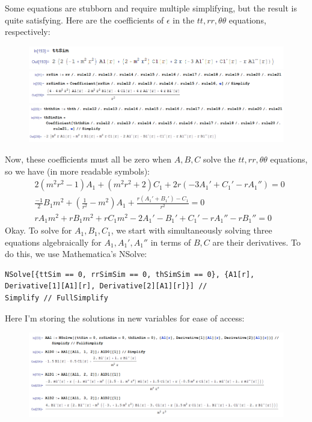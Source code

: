\documentclass{book}
\theoremstyle{definition}
\newcommand{\f}[2]{\frac{#1}{#2}}
\newcommand{\lp}{\left(}
\newcommand{\rp}{\right)}
\begin{document}
Some equations are stubborn and require multiple simplifying, but the result is quite satisfying. Here are the coefficients of $\epsilon$ in the $tt,rr,\theta\theta$ equations, respectively:
\begin{figure}[!htb]
	\centering
	\includegraphics[scale=0.4]{e1}
	\includegraphics[scale=0.4]{e2}
	\includegraphics[scale=0.4]{e3}
\end{figure}
Now, these coefficients must all be zero when $A,B,C$ solve the $tt,rr,\theta\theta$ equations, so we have (in more readable symbols):
\begin{align}
&2(m^2r^2-1)A_1+(m^2r^2+2)C_1+2r(-3A_1'+C_1'-rA_1'')= 0\\
&\f{-1}{2}B_1m^2+\lp \f{1}{r^2}-m^2 \rp A_1 + \f{r(A_1'+B_1')-C_1}{r^2} = 0\\
&rA_1m^2+rB_1m^2+rC_1m^2-2A_1'-B_1'+C_1'-rA_1''-rB_1''=0
\end{align}
Okay. To solve for $A_1,B_1,C_1$, we start with simultaneously solving three equations algebraically for $A_1,A_1',A_1''$ in terms of $B,C$ are their derivatives. To do this, we use Mathematica's NSolve:
\begin{lstlisting}
NSolve[{ttSim == 0, rrSimSim == 0, thSimSim == 0}, {A1[r], 
Derivative[1][A1][r], Derivative[2][A1][r]}] // 
Simplify // FullSimplify
\end{lstlisting}
Here I'm storing the solutions in new variables for ease of access:
\begin{figure}[!htb]
	\centering
	\includegraphics[scale=0.4]{AA}
\end{figure}
\end{document}
